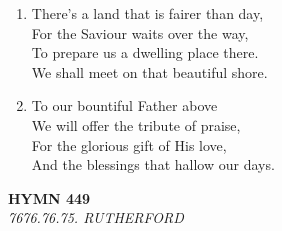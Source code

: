 \documentclass[11pt,a4paper]{article}
\begin{document}
\begin{enumerate}
    \item There's a land that is fairer than day, \\
        For the Saviour waits over the way, \\
        To prepare us a dwelling place there. \\
        We shall meet on that beautiful shore.

    \item To our bountiful Father above \\
        We will offer the tribute of praise, \\
        For the glorious gift of His love, \\
        And the blessings that hallow our days.

\end{enumerate}

\newpage
\begin{center}
    {\Large \textbf{HYMN 449}}
    \\
    \textit{7676.76.75. RUTHERFORD}
\end{center}
\vspace{1em}
\end{document}
